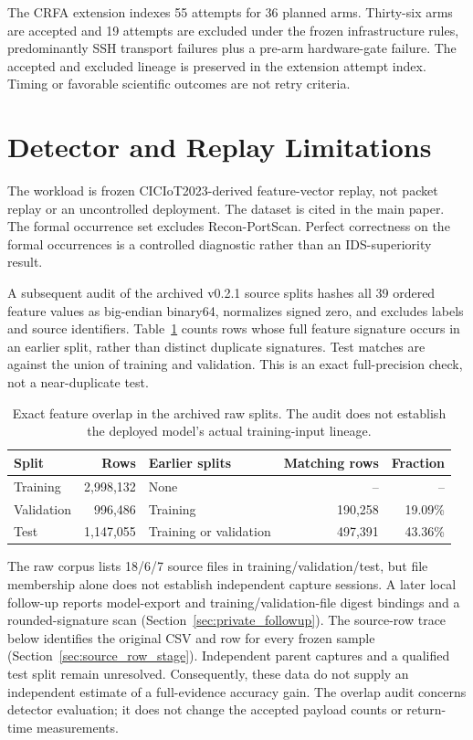 \documentclass[10pt,onecolumn]{IEEEtran}
\begin{document}
The CRFA extension indexes 55 attempts for 36 planned arms. Thirty-six arms
are accepted and 19 attempts are excluded under the frozen infrastructure
rules, predominantly SSH transport failures plus a pre-arm hardware-gate
failure. The accepted and excluded lineage is preserved in the extension
attempt index. Timing or favorable scientific outcomes are not retry criteria.

\section{Detector and Replay Limitations}
The workload is frozen CICIoT2023-derived feature-vector replay, not packet
replay or an uncontrolled deployment. The dataset is cited in the main paper.
The formal occurrence set excludes Recon-PortScan. Perfect correctness on
the formal occurrences is a controlled diagnostic rather than an
IDS-superiority result.

A subsequent audit of the archived v0.2.1 source splits hashes all 39 ordered
feature values as big-endian binary64, normalizes signed zero, and excludes
labels and source identifiers. Table~\ref{tab:raw_split_overlap} counts rows
whose full feature signature occurs in an earlier split, rather than distinct
duplicate signatures. Test matches are against the union of training and
validation. This is an exact full-precision check, not a near-duplicate test.

\begin{table}[H]
\centering
\caption{Exact feature overlap in the archived raw splits. The audit does
not establish the deployed model's actual training-input lineage.}
\label{tab:raw_split_overlap}
\small
\begin{tabular}{@{}lrlrr@{}}
\toprule
Split & Rows & Earlier splits & Matching rows & Fraction \\
\midrule
Training & 2,998,132 & None & -- & -- \\
Validation & 996,486 & Training & 190,258 & 19.09\% \\
Test & 1,147,055 & Training or validation & 497,391 & 43.36\% \\
\bottomrule
\end{tabular}
\end{table}

The raw corpus lists 18/6/7 source files in training/validation/test, but file
membership alone does not establish independent capture sessions. A later
local follow-up reports model-export and training/validation-file digest
bindings and a rounded-signature scan (Section~\ref{sec:private_followup}).
The source-row trace below identifies the original CSV and row for every
frozen sample (Section~\ref{sec:source_row_stage}).
Independent parent captures and a qualified test split remain unresolved.
Consequently, these data do not supply an independent estimate of a
full-evidence accuracy gain. The overlap audit concerns detector evaluation;
it does not change the accepted payload counts or return-time measurements.
\end{document}
